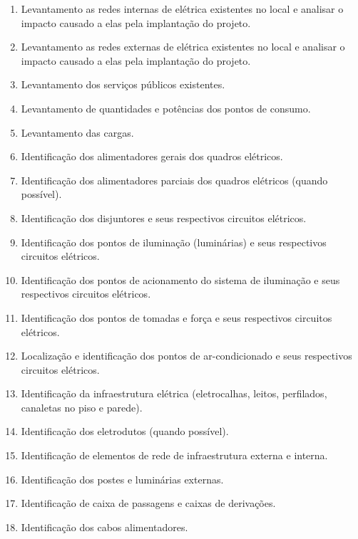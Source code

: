 \begin{enumerate}\label{subsection: levantamento}
	
	\item Levantamento as redes internas de elétrica existentes no local e analisar o impacto causado a elas pela implantação do projeto. 
	
	\item Levantamento as redes externas de elétrica existentes no local e analisar o impacto causado a elas pela implantação do projeto.
	
	\item Levantamento dos serviços públicos existentes.
	
	\item Levantamento de quantidades e potências dos pontos de consumo.
	
	\item Levantamento das cargas.
	
	\item Identificação dos alimentadores gerais dos quadros elétricos.
	
	\item Identificação dos alimentadores parciais dos quadros elétricos (quando possível).

	\item Identificação dos disjuntores e seus respectivos circuitos elétricos.
	
	\item Identificação dos pontos de iluminação (luminárias) e seus respectivos circuitos elétricos.
	
	\item Identificação dos pontos de acionamento do sistema de iluminação e seus respectivos circuitos elétricos.
	
	\item Identificação dos pontos de tomadas e força e seus respectivos circuitos elétricos.
	
	\item Localização e identificação dos pontos de ar-condicionado e seus respectivos circuitos elétricos.
	
	\item Identificação da infraestrutura elétrica (eletrocalhas, leitos, perfilados, canaletas no piso e parede).
	
	\item Identificação dos eletrodutos (quando possível).
	
	\item Identificação de elementos de rede de infraestrutura externa e interna.
	
	\item Identificação dos postes e luminárias externas.
	
	\item Identificação de caixa de passagens e caixas de derivações.
	
	\item Identificação dos cabos alimentadores.

\end{enumerate}

